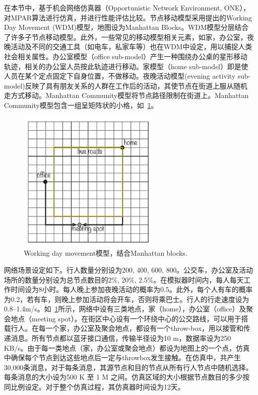 在本节中，基于机会网络仿真器（Opportunistic Network Environment, ONE）\cite{Keranen2009}，对MPAR算法进行仿真，并进行性能评估比较。节点移动模型采用\cite{Ekman:2008fp}提出的Working Day Movement (WDM)模型，地图设为Manhattan Blocks。WDM模型分层结合了许多子节点移动模型。此外，一些常见的移动模型相关元素，如家，办公室，夜晚活动及不同的交通工具（如电车，私家车等）也在WDM中设定，用以捕捉人类社会相关属性。办公室模型（office sub-model）产生一种围绕办公桌的星形移动轨迹，相关的办公室人员按此轨迹进行移动。家模型（home sub-model）即是使人员在某个定点固定下自身位置，不做移动。夜晚活动模型(evening activity sub-model)反映了具有朋友关系的人群在工作后的活动，其使节点在街道上服从随机走方式移动。Manhattan Community模型将节点路径限制在街道上。Manhattan Community模型包含一组呈矩阵状的小格，如\figurename~\ref{fig:chap3_manhattan}。

\begin{figure}[!t]
\centering
\includegraphics[width=2.7in]{paper-MPAR/Manhattan}
\caption{Working day movement模型，结合Manhattan blocks.}
\label{fig:chap3_manhattan}
\end{figure}

网络场景设定如下。行人数量分别设为200, 400, 600, 800。公交车，办公室及活动场所的数量分别设为总节点数目的2\%, 20\%, 2.5\%。在模拟器时间内，每人每天工作时间设为8小时。每人晚上参加夜晚活动的概率为0.5。此外，每个人有车的概率为0.2，若有车，则晚上参加活动将会开车，否则将乘巴士。行人的行走速度设为0.8--1.4m/s。如\figurename~\ref{fig:chap3_manhattan}所示，网络中设有三类地点，家（home），办公室（office）及聚会地点（meeting spot）。在街区中心设有一个环绕中心的公交路线，可以用于搭载行人。在每一个家，办公室及聚会地点，都设有一个throw-box，用以接管和传递消息。所有节点都以蓝牙接口通信，传输半径设为10 m，数据率设为250 KB/s。由于每一类地点（家，办公室或聚会地点）都设为地图上的一个点，仿真中确保每个节点到达这些地点后一定与throwbox发生接触。在仿真中，共产生30,000条消息，对于每条消息，其源节点和目的节点从所有行人节点中随机选择。每条消息的大小设为500 K 至 1 M 之间。仿真区域的大小根据节点数目的多少按同比例设定。对于整个仿真过程，其仿真器时间设为12天。

